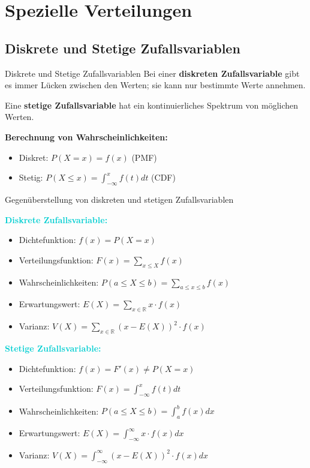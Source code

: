 \section{Spezielle Verteilungen} 

\subsection{Diskrete und Stetige Zufallsvariablen}

\begin{definition}{Diskrete und Stetige Zufallsvariablen}
Bei einer \textbf{diskreten Zufallsvariable} gibt es immer Lücken zwischen den Werten; sie kann nur bestimmte Werte annehmen.

Eine \textbf{stetige Zufallsvariable} hat ein kontinuierliches Spektrum von möglichen Werten.

\textbf{Berechnung von Wahrscheinlichkeiten:}
\begin{itemize}
    \item Diskret: $P(X=x) = f(x)$ (PMF)
    \item Stetig: $P(X \leq x) = \int_{-\infty}^x f(t)dt$ (CDF)
\end{itemize}
\end{definition}

\begin{concept}{Gegenüberstellung von diskreten und stetigen Zufallsvariablen}

\textcolor{darkturquoise}{\textbf{Diskrete Zufallsvariable:}}
\begin{itemize}
    \item Dichtefunktion: $f(x) = P(X=x)$
    \item Verteilungsfunktion: $F(x) = \sum_{x \leq X} f(x)$
    \item Wahrscheinlichkeiten: $P(a \leq X \leq b) = \sum_{a \leq x \leq b} f(x)$
    \item Erwartungswert: $E(X) = \sum_{x \in \mathbb{R}} x \cdot f(x)$
    \item Varianz: $V(X) = \sum_{x \in \mathbb{R}} (x-E(X))^2 \cdot f(x)$
\end{itemize}

\textcolor{darkturquoise}{\textbf{Stetige Zufallsvariable:}}
\begin{itemize}
    \item Dichtefunktion: $f(x) = F'(x) \neq P(X=x)$
    \item Verteilungsfunktion: $F(x) = \int_{-\infty}^x f(t)dt$
    \item Wahrscheinlichkeiten: $P(a \leq X \leq b) = \int_a^b f(x)dx$
    \item Erwartungswert: $E(X) = \int_{-\infty}^{\infty} x \cdot f(x)dx$
    \item Varianz: $V(X) = \int_{-\infty}^{\infty} (x-E(X))^2 \cdot f(x)dx$
\end{itemize}
\end{concept}


